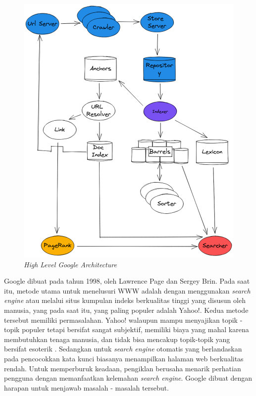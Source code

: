 \begin{figure}[H]
	\centering
	\includegraphics[keepaspectratio, width=\textwidth]{gambar/google_architecture_filled}
	\caption{\emph{High Level Google Architecture} \citep{brin1998anatomy}}
	\label{gambar:google_architecture_filled}
\end{figure}

Google dibuat pada tahun 1998, oleh Lawrence Page dan Sergey Brin. Pada saat itu, metode utama untuk menelusuri WWW adalah dengan menggunakan \textit{search engine} atau melalui situs kumpulan indeks berkualitas tinggi yang disusun oleh manusia, yang pada saat itu, yang paling populer adalah Yahoo!. Kedua metode tersebut memiliki permasalahan. Yahoo! walaupun mampu menyajikan topik - topik populer tetapi bersifat sangat subjektif, memiliki biaya yang mahal karena membutuhkan tenaga manusia, dan tidak bisa mencakup topik-topik yang bersifat esoterik \citep{brin1998anatomy}. Sedangkan untuk \textit{search engine} otomatis yang berlandaskan pada pencocokkan kata kunci biasanya menampilkan halaman web berkualitas rendah. Untuk memperburuk keadaan, pengiklan berusaha menarik perhatian pengguna dengan memanfaatkan kelemahan \textit{search engine}. Google dibuat dengan harapan untuk menjawab masalah - masalah tersebut.

